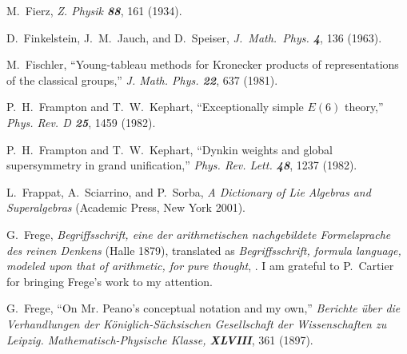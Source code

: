  M.~Fierz,
{\em Z. Physik   \bf 88}, 161 (1934).

D.~Finkelstein, J.~M.~Jauch, and D.~Speiser,
{\em J.~Math.~Phys.  \bf 4}, 136 (1963).

 M.~Fischler,
``Young-tableau methods for Kronecker products of representations of the
classical groups,''
{\em J. Math. Phys.   \bf 22}, 637 (1981).




P.~H.~Frampton and T.~W.~Kephart,
``Exceptionally simple $E(6)$ theory,''
{\em Phys.  Rev.    D \bf 25}, 1459 (1982).

P.~H.~Frampton and T.~W.~Kephart,
``Dynkin weights and global supersymmetry in grand unification,''
{\em Phys.  Rev.  Lett.    \bf 48}, 1237 (1982).

 L.~Frappat, A.~Sciarrino, and P.~Sorba,
    {\em A Dictionary of Lie Algebras and Superalgebras}
    (Academic Press, New York 2001).

 G.~Frege,
    {\em Begriffsschrift, eine der arithmetischen
    nachgebildete Formelsprache des reinen Denkens} (Halle 1879),
    translated as {\em  Begriffsschrift, formula language, modeled upon that
    of arithmetic, for pure thought},
    . I am grateful to P.~Cartier for bringing
    Frege's work to my attention.

 G.~Frege,
    ``On Mr. Peano's conceptual notation and my own,''
    {\em Berichte \"uber die Verhandlungen der
     K\"oniglich-S\"achsischen Gesellschaft
    der Wissenschaften zu Leipzig. Mathematisch-Physische Klasse,
    \bf XLVIII}, 361 (1897). %

